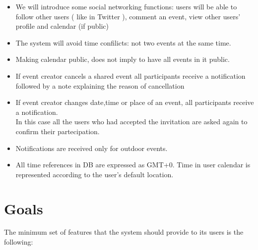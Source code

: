 \documentclass[12pt]{book}
\begin{document}
\begin{itemize}
	\item We will introduce some social networking functions: users will be able to follow other users ( like in Twitter ), comment an event, view other users' profile and calendar (if public)
	\item The system will avoid time confilicts: not two events at the same time. \\ 
	\item Making calendar public, does not imply to have all events in it public.\\
	\item If event creator cancels a shared event all participants receive a notification followed by a note explaining the reason of cancellation \\
	\item If event creator changes date,time or place of an event, all participants receive a notification. \\ In this case all the users who had accepted the invitation are asked again to confirm their partecipation. \\
	\item Notifications are received only for outdoor events. \\
	\item All time references in DB are expressed as GMT+0. Time in user calendar is represented according to the user's default location. 
	\end{itemize} 
\vspace{5cm}
\newpage
\section{Goals}

The minimum set of features that the system should provide to its users is the following:\\ 
\end{document}
